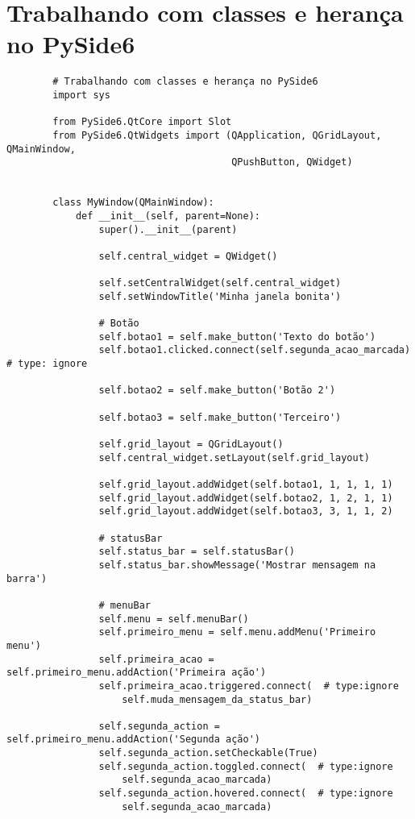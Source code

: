 \documentclass[12pt,a4paper]{article}
\begin{document}
    \section{Trabalhando com classes e herança no PySide6}
    \begin{lstlisting}
        # Trabalhando com classes e herança no PySide6
        import sys
        
        from PySide6.QtCore import Slot
        from PySide6.QtWidgets import (QApplication, QGridLayout, QMainWindow,
                                       QPushButton, QWidget)
        
        
        class MyWindow(QMainWindow):
            def __init__(self, parent=None):
                super().__init__(parent)
        
                self.central_widget = QWidget()
        
                self.setCentralWidget(self.central_widget)
                self.setWindowTitle('Minha janela bonita')
        
                # Botão
                self.botao1 = self.make_button('Texto do botão')
                self.botao1.clicked.connect(self.segunda_acao_marcada)  # type: ignore
        
                self.botao2 = self.make_button('Botão 2')
        
                self.botao3 = self.make_button('Terceiro')
        
                self.grid_layout = QGridLayout()
                self.central_widget.setLayout(self.grid_layout)
        
                self.grid_layout.addWidget(self.botao1, 1, 1, 1, 1)
                self.grid_layout.addWidget(self.botao2, 1, 2, 1, 1)
                self.grid_layout.addWidget(self.botao3, 3, 1, 1, 2)
        
                # statusBar
                self.status_bar = self.statusBar()
                self.status_bar.showMessage('Mostrar mensagem na barra')
        
                # menuBar
                self.menu = self.menuBar()
                self.primeiro_menu = self.menu.addMenu('Primeiro menu')
                self.primeira_acao = self.primeiro_menu.addAction('Primeira ação')
                self.primeira_acao.triggered.connect(  # type:ignore
                    self.muda_mensagem_da_status_bar)
        
                self.segunda_action = self.primeiro_menu.addAction('Segunda ação')
                self.segunda_action.setCheckable(True)
                self.segunda_action.toggled.connect(  # type:ignore
                    self.segunda_acao_marcada)
                self.segunda_action.hovered.connect(  # type:ignore
                    self.segunda_acao_marcada)
        

\end{lstlisting}
\end{document}
